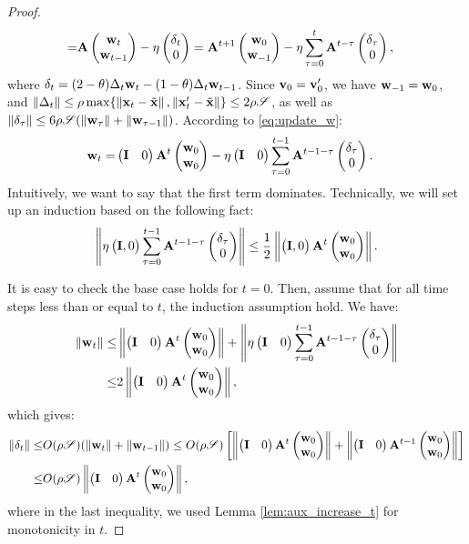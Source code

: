 \begin{proof}
\begin{align}
=& \A\pmat{\w_t \\ \w_{t-1}} -\eta\pmat{ \delta_t \\ 0} = \A^{t+1}\pmat{\w_0 \\ \w_{-1}} 
-\eta\sum_{\tau = 0}^t \A^{t-\tau}\pmat{ \delta_\tau \\ 0},
\label{eq:update_w}
\end{align}
where $\delta_t = (2-\theta) \Delta_t \w_t - (1 - \theta) \Delta_{t} \w_{t-1}$. Since $\v_0 = \v'_0$, we have $\w_{-1} = \w_0$, and $\norm{\Delta_t} \le \rho\max\{\norm{\x_t - \tilde{\x}},  \norm{\modify{\x}_t- \tilde{\x}}\}
\le 2\rho\uspace$, as well as $\norm{\delta_\tau} \le  6\rho\uspace(\norm{\w_\tau} + \norm{\w_{\tau-1}})$. According to \eqref{eq:update_w}:
\begin{align*}
\w_t
=& \pmat{\I & 0}\A^{t}\pmat{\w_0 \\ \w_{0}} -\eta\pmat{\I & 0}\sum_{\tau = 0}^{t-1} \A^{t-1-\tau}\pmat{ \delta_\tau \\ 0}.
\end{align*}
Intuitively, we want to say that the first term dominates. Technically, we will 
set up an induction based on the following fact:
\begin{align*}
\norm{\eta\pmat{\I, 0}\sum_{\tau = 0}^{t-1} \A^{t-1-\tau}\pmat{\delta_\tau \\ 0} }
\le \frac{1}{2}\norm{\pmat{\I, 0}\A^{t}\pmat{\w_0 \\ \w_{0}}}.
\end{align*}

It is easy to check the base case holds for $t=0$. Then, assume that for all time steps less than or equal to $t$, the induction assumption hold. We have:
\begin{align*}
\norm{\w_t} 
\le& \norm{\pmat{\I & 0}\A^{t}\pmat{\w_0 \\ \w_{0}}} +\norm{\eta\pmat{\I & 0}\sum_{\tau = 0}^{t-1} \A^{t-1-\tau}\pmat{ \delta_\tau \\ 0} } \\
\le& 2\norm{\pmat{\I & 0}\A^{t}\pmat{\w_0 \\ \w_{0}}},
\end{align*}
which gives:
\begin{align*}
\norm{\delta_t} \le& O(\rho\uspace)(\norm{\w_t} + \norm{\w_{t-1}})
\le O(\rho\uspace) \left[\norm{\pmat{\I & 0}\A^{t}\pmat{\w_0 \\ \w_{0}}}
+ \norm{\pmat{\I & 0}\A^{t-1}\pmat{\w_0 \\ \w_{0}}}\right] \\
\le& O(\rho\uspace) \norm{\pmat{\I & 0}\A^{t}\pmat{\w_0 \\ \w_{0}}},
\end{align*}
where in the last inequality, we used Lemma \ref{lem:aux_increase_t} 
for monotonicity in $t$.



\end{proof}
